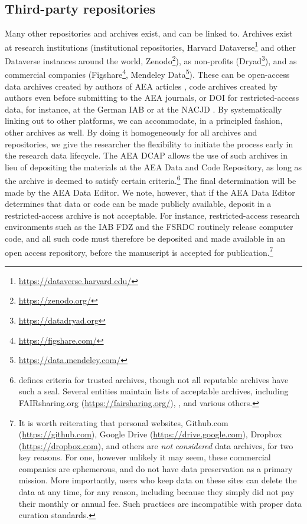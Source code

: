 \documentclass[PP]{AEA}
\newcommand{\misscitep}[2]{\citep{#2}}
\newcommand{\misscitep}[2]{\todo[color=green]{Missing citation: #1}{(\textcolor{red}{#2})}}
\newcommand{\aeadcr}{AEA Data and Code Repository}
\newcommand{\urlcite}[2]{#2\footnote{\url{#1}}}
\newcommand{\furlcite}[2]{#2 (\url{#1})}
\begin{document}
\subsection{Third-party repositories}
Many other repositories and archives exist, and can be linked to. Archives exist at research institutions (institutional repositories, \urlcite{https://dataverse.harvard.edu/}{Harvard Dataverse} and other Dataverse instances around the world, \urlcite{https://zenodo.org/}{Zenodo}), as non-profits (\urlcite{https://datadryad.org}{Dryad}), and as commercial companies (\urlcite{https://figshare.com/}{Figshare}, \urlcite{https://data.mendeley.com/}{Mendeley Data}).
These can be open-access data archives created by authors of \ac{AEA} articles \citep{Development2017,Gentzkow2011}, code archives created by authors even before submitting to the AEA journals, or \ac{DOI} for restricted-access data, for instance, at the German \ac{IAB} \citep{10.5164/IAB.BHP7517.de.en.v1,10.5164/iab.fdzd.1801.de.v1} or at the \ac{NACJD} \citep{10.3886/icpsr29721.v1}. By systematically linking out to other platforms, we can accommodate, in a principled fashion, other archives as well. By doing it homogeneously for all archives and repositories, we give the researcher the flexibility to initiate the process early in the research data lifecycle.
The AEA \ac{DCAP} allows the use of such archives in lieu of depositing the materials at the \aeadcr{}, as long as the archive is deemed to satisfy certain criteria.\footnote{ \citet{CoreTrustSealCoreTrustSeal2017} defines criteria for trusted archives, though not all reputable archives have such a seal. Several entities  maintain  lists of acceptable archives, including \furlcite{https://fairsharing.org/}{FAIRsharing.org}, \citet{NatureScientificData2018}, and various others.} The final determination will be made by the AEA Data Editor. We note, however, that if the AEA Data Editor determines that data or code can be made publicly available, deposit in a restricted-access archive is not acceptable. For instance, restricted-access research environments such as the \ac{IAB} FDZ and the \ac{FSRDC} routinely release computer code, and all such code must therefore be deposited and made available in an open access repository, before the manuscript is accepted for publication.\footnote{%
It is worth reiterating that  personal websites, \furlcite{https://github.com}{Github.com}, \furlcite{https://drive.google.com}{Google Drive}, \furlcite{https://dropbox.com}{Dropbox}, and others are \textit{not} \textit{considered} data archives, for two key reasons. For one, however unlikely it may seem, these commercial companies are ephemerous, and do not have data preservation as a primary mission. More importantly, users who keep data on these sites can delete the data at any time, for any reason, including  because they simply did not pay their monthly or annual fee. Such practices are incompatible with proper data curation standards. }
	
\end{document}
